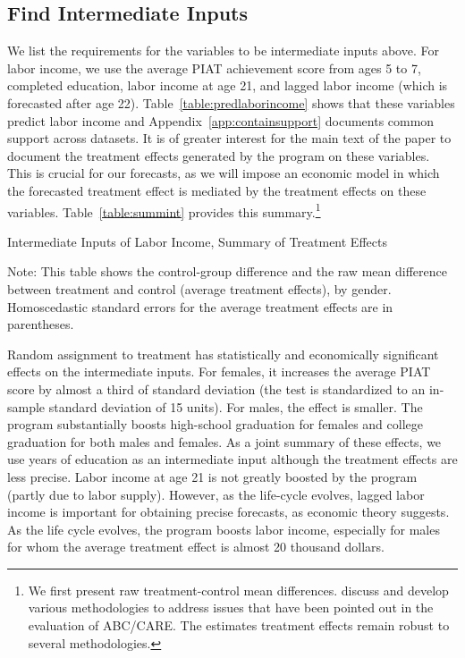 \subsection{Find Intermediate Inputs}

\noindent We list the requirements for the variables to be intermediate inputs above. For labor income, we use the average PIAT achievement score from ages 5 to 7, completed education, labor income at age 21, and lagged labor income (which is forecasted after age 22). Table~\ref{table:predlaborincome} shows that these variables predict labor income and Appendix~\ref{app:containsupport} documents common support across datasets. It is of greater interest for the main text of the paper to document the treatment effects generated by the program on these variables. This is crucial for our forecasts, as we will impose an economic model in which the forecasted treatment effect is mediated by the treatment effects on these variables. Table~\ref{table:summint} provides this summary.\footnote{We first present raw treatment-control mean differences. \citet{Garcia_Heckman_Ziff_2017_Gender-Diff_UNPUBLISHED} discuss and develop various methodologies to address issues that have been pointed out in the evaluation of ABC/CARE. The estimates treatment effects remain robust to several methodologies.}\\

\begin{table}[!htpb]
\begin{threeparttable}
\caption{Intermediate Inputs of Labor Income, Summary of Treatment Effects} \label{table:summint}
\centering

\begin{tablenotes}
\footnotesize
\item Note: This table shows the control-group difference and the raw mean difference between treatment and control (average treatment effects), by gender. Homoscedastic standard errors for the average treatment effects are in parentheses.
\end{tablenotes}
\end{threeparttable}
\end{table}

\noindent Random assignment to treatment has statistically and economically significant effects on the intermediate inputs. For females, it increases the average PIAT score by almost a third of standard deviation (the test is standardized to an in-sample standard deviation of 15 units). For males, the effect is smaller. The program substantially boosts high-school graduation for females and college graduation for both males and females. As a joint summary of these effects, we use years of education as an intermediate input although the treatment effects are less precise. Labor income at age 21 is not greatly boosted by the program (partly due to labor supply). However, as the life-cycle evolves, lagged labor income is important for obtaining precise forecasts, as economic theory suggests. As the life cycle evolves, the program boosts labor income, especially for males for whom the average treatment effect is almost 20 thousand dollars.

